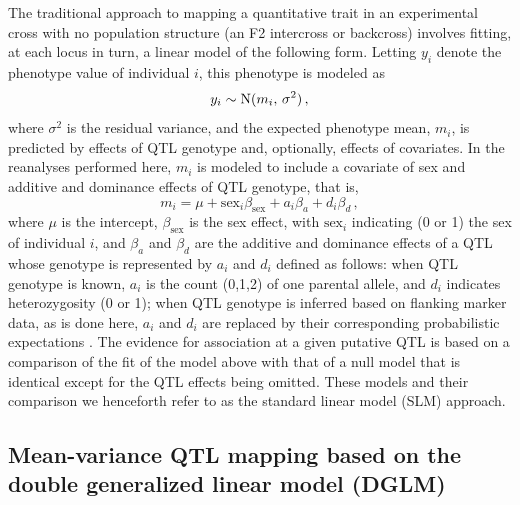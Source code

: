     The traditional approach to mapping a quantitative trait in an experimental cross with no population structure (\eg an F2 intercross or backcross) involves fitting, at each locus in turn, a linear model of the following form. Letting $y_i$ denote the phenotype value of individual $i$, this phenotype is modeled as
    \[
        y_i \sim \mathrm{N}(m_i,\, \sigma^2)\,,
    \]
    where $\sigma^2$ is the residual variance, and the expected phenotype mean, $m_i$, is predicted by effects of QTL genotype and, optionally, effects of covariates. In the reanalyses performed here, $m_i$ is modeled to include a covariate of sex and additive and dominance effects of QTL genotype, that is,
    \[
        m_i = \mu + \text{sex}_i\beta_\text{sex} + a_i\beta_a + d_i\beta_d\,,
    \]
    where $\mu$ is the intercept, $\beta_\text{sex}$ is the sex effect, with $\text{sex}_i$ indicating (0 or 1) the sex of individual $i$, and $\beta_a$ and $\beta_d$ are the additive and dominance effects of a QTL whose genotype is represented by $a_i$ and $d_i$ defined as follows: when QTL genotype is known, $a_i$ is the count (0,1,2) of one parental allele, and $d_i$ indicates heterozygosity (0 or 1); when QTL genotype is inferred based on flanking marker data, as is done here, $a_i$ and $d_i$ are replaced by their corresponding probabilistic expectations \citep{Haley1992,Martinez1992}. The evidence for association at a given putative QTL is based on a comparison of the fit of the model above with that of a null model that is identical except for the QTL effects being omitted. These models and their comparison we henceforth refer to as the standard linear model (SLM) approach.

\subsection{Mean-variance QTL mapping based on the double generalized linear model (DGLM)}

